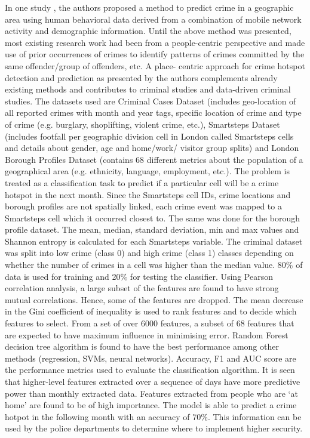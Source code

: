 \documentclass{sigkddExp}
\begin{document}
In one study \cite{OUAC}, the authors proposed a method to predict crime in a geographic area using human behavioral data derived from a combination of mobile network activity and demographic information. Until the above method was presented, most existing research work had been from a people-centric perspective and made use of prior occurrences of crimes to identify patterns of crimes committed by the same offender/group of offenders, etc. A place- centric approach for crime hotspot detection and prediction as presented by the authors complements already existing methods and contributes to criminal studies and data-driven criminal studies. The datasets used are Criminal Cases Dataset (includes geo-location of all reported crimes with month and year tags, specific location of crime and type of crime (e.g. burglary, shoplifting, violent crime, etc.), Smartsteps Dataset (includes footfall per geographic division cell in London called Smartsteps cells and details about gender, age and home/work/ visitor group splits) and London Borough Profiles Dataset (contains 68 different metrics about the population of a geographical area (e.g. ethnicity, language, employment, etc.). The problem is treated as a classification task to predict if a particular cell will be a crime hotspot in the next month. Since the Smartsteps cell IDs, crime locations and borough profiles are not spatially linked, each crime event was mapped to a Smartsteps cell which it occurred closest to. The same was done for the borough profile dataset. The mean, median, standard deviation, min and max values and Shannon entropy is calculated for each Smartsteps variable. The criminal dataset was split into low crime (class 0) and high crime (class 1) classes depending on whether the number of crimes in a cell was higher than the median value. 80\% of data is used for training and 20\% for testing the classifier. Using Pearson correlation analysis, a large subset of the features are found to have strong mutual correlations. Hence, some of the features are dropped. The mean decrease in the Gini coefficient of inequality is used to rank features and to decide which features to select. From a set of over 6000 features, a subset of 68 features that are expected to have maximum influence in minimising error. Random Forest decision tree algorithm is found to have the best performance among other methods (regression, SVMs, neural networks). Accuracy, F1 and AUC score are the performance metrics used to evaluate the classification algorithm. It is seen that higher-level features extracted over a sequence of days have more predictive power than monthly extracted data. Features extracted from people who are ‘at home’ are found to be of high importance. The model is able to predict a crime hotpot in the following month with an accuracy of 70\%. This information can be used by the police departments to determine where to implement higher security.
\end{document}
